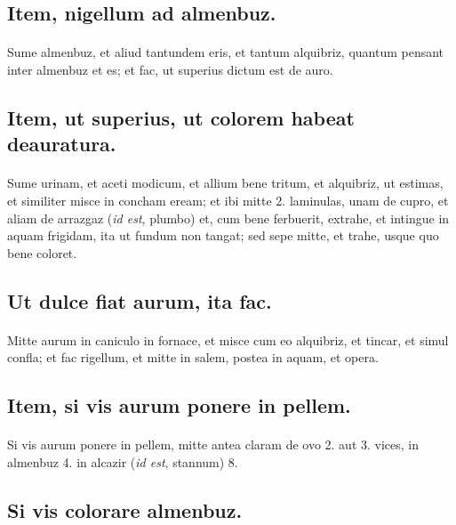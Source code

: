 \documentclass[a4paper, 11pt, oneside, polutonikogreek, italian]{article}
\begin{document}
\subsection{Item, nigellum ad almenbuz.}
\paragraph{}
Sume almenbuz, et aliud tantundem eris, et tantum alquibriz, quantum pensant inter almenbuz et es; et fac, ut superius dictum est de auro.

\subsection{Item, ut superius, ut colorem habeat deauratura.}
\paragraph{}
Sume urinam, et aceti modicum, et allium bene tritum, et alquibriz, ut estimas, et similiter misce in concham eream; et ibi mitte 2. laminulas, unam de cupro, et aliam de arrazgaz (\emph{id est}, plumbo) et, cum bene ferbuerit, extrahe, et intingue in aquam frigidam, ita ut fundum non tangat; sed sepe mitte, et trahe, usque quo bene coloret.

\subsection{Ut dulce fiat aurum, ita fac.}
\paragraph{}
Mitte aurum in caniculo in fornace, et misce cum eo alquibriz, et tincar, et simul confla; et fac rigellum, et mitte in salem, postea in aquam, et opera.

\subsection{Item, si vis aurum ponere in pellem.}
\paragraph{}
Si vis aurum ponere in pellem, mitte antea claram de ovo 2. aut 3. vices, in almenbuz 4. in alcazir (\emph{id est}, stannum) 8.

\subsection{Si vis colorare almenbuz.}
\end{document}

